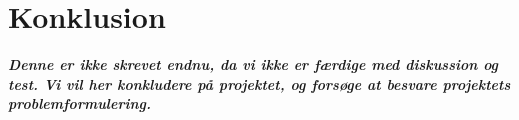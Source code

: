 \section{Konklusion}
\textbf{\textit{Denne er ikke skrevet endnu, da vi ikke er færdige med diskussion og test. Vi vil her konkludere på projektet, og forsøge at besvare projektets problemformulering.}}